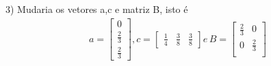 \documentclass[a4paper,12pt]{article}
\begin{document}
3) Mudaria os vetores a,c e matriz B, isto \'e
{\arraycolsep=3.4pt\def\arraystretch{1.4}
\begin{align*}
	 a = \left [
		 \begin{array}{c}	
			 0 \\
			 \frac{2}{3} \\
			 \frac{2}{3} 
\end{array} \right 
], 
c =\left [
	\begin{array}{ccc} 
		\frac{1}{4} & \frac{3}{8} & \frac{3}{8}
\end{array}
\right ] 
e \hspace{2pt} 
B =\left [
	\begin{array}{cc} 
		 \frac{2}{3} & 0 \\ 
		0 & \frac{2}{3}\\ 
\end{array}
\right 
]
\end{align*}
}
\end{document}
